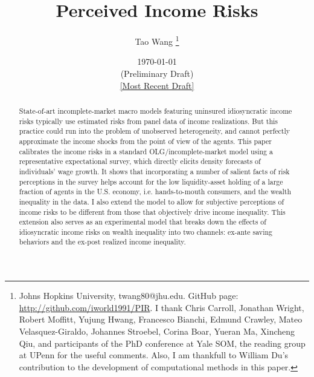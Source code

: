 \begin{titlepage}
 \title{Perceived Income Risks}
 
 \author{Tao Wang \thanks{Johns Hopkins University, twang80@jhu.edu. GitHub page: \url{http://github.com/iworld1991/PIR}. I thank Chris Carroll, Jonathan Wright, Robert Moffitt, Yujung Hwang, Francesco Bianchi, Edmund Crawley, Mateo Velasquez-Giraldo, Johannes Stroebel, Corina Boar, Yueran Ma, Xincheng Qiu, and participants of the PhD conference at Yale SOM, the reading group at UPenn for the useful comments. Also, I am thankfull to William Du's contribution to the development of computational methods in this paper.}}

\date{\today \\(Preliminary Draft) \\\href{https://github.com/iworld1991/PIR/blob/master/PIR.pdf}{[Most Recent Draft]}}
	\maketitle
	\begin{abstract}
	\begin{singlespace}
		\noindent State-of-art incomplete-market macro models featuring uninsured idiosyncratic income risks typically use estimated risks from panel data of income realizations. But this practice could run into the problem of unobserved heterogeneity, and cannot perfectly approximate the income shocks from the point of view of the agents. This paper calibrates the income risks in a standard OLG/incomplete-market model using a representative expectational survey, which directly elicits density forecasts of individuals' wage growth. It shows that incorporating a number of salient facts of risk perceptions in the survey helps account for the low liquidity-asset holding of a large fraction of agents in the U.S. economy, i.e. hands-to-mouth consumers, and the wealth inequality in the data. I also extend the model to allow for subjective perceptions of income risks to be different from those that objectively drive income inequality. This extension also serves as an experimental model that breaks down the effects of idiosyncratic income risks on wealth inequality into two channels: ex-ante saving behaviors and the ex-post realized income inequality.
		

\end{singlespace}
\end{abstract}
\end{titlepage}
